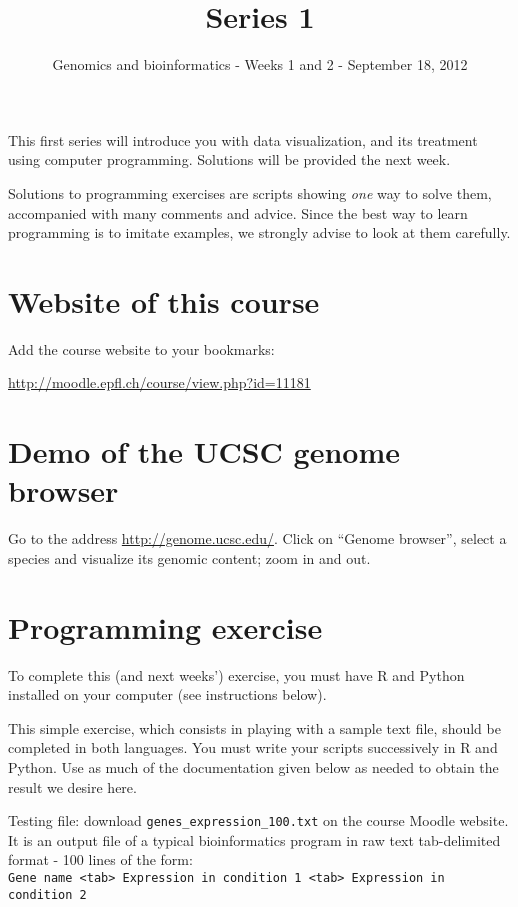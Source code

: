 \documentclass[a4paper,11pt]{article}
\title{Series 1}
\date{}
\author{Genomics and bioinformatics - Weeks 1 and 2 - September 18, 2012}
\begin{document}
\maketitle

This first series will introduce you with data visualization, and its treatment using computer programming.
Solutions will be provided the next week. 

Solutions to programming exercises are scripts showing \textit{one}
way to solve them, accompanied with many comments and advice. Since the best way to learn programming is to 
imitate examples, we strongly advise to look at them carefully.

\section{Website of this course}
Add the course website to your bookmarks:

\url{http://moodle.epfl.ch/course/view.php?id=11181}

\section{Demo of the UCSC genome browser}
Go to the address \url{http://genome.ucsc.edu/}. Click on ``Genome browser'', select a species
and visualize its genomic content; zoom in and out.

\section{Programming exercise}
To complete this (and next weeks') exercise, you must have R and Python installed on your computer (see instructions below).

This simple exercise, which consists in playing with a sample text file, should be completed in both languages. You must write your scripts successively in R and Python. Use as much of the documentation given below as needed to obtain the result we desire here.

Testing file: download \texttt{genes\_expression\_100.txt} on the course Moodle website. It is an output file of a typical bioinformatics program in raw text tab-delimited format - 100 lines of the form:\\

\texttt{Gene name <tab> Expression in condition 1 <tab> Expression in condition 2}\\
\end{document}
